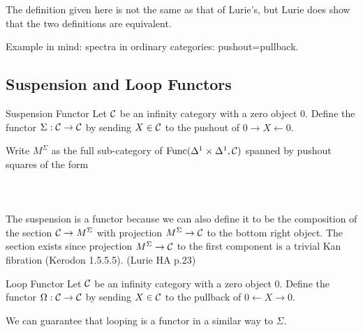 \documentclass[a4paper]{article}
\begin{document}
The definition given here is not the same as that of Lurie's, but Lurie does show that the two definitions are equivalent. 

Example in mind: spectra in ordinary categories: pushout=pullback. 

\subsection{Suspension and Loop Functors}
\begin{defn}{Suspension Functor}{} Let $\mathcal{C}$ be an infinity category with a zero object $0$. Define the functor $\Sigma:\mathcal{C}\to\mathcal{C}$ by sending $X\in\mathcal{C}$ to the pushout of $0\rightarrow X\leftarrow 0$. 
\end{defn}

Write $M^\Sigma$ as the full sub-category of $\text{Func}(\Delta^1\times\Delta^1,\mathcal{C})$ spanned by pushout squares of the form \\~\\
\\~\\
The suspension is a functor because we can also define it to be the composition of the section $\mathcal{C}\to M^\Sigma$ with projection $M^\Sigma\to\mathcal{C}$ to the bottom right object. The section exists since projection $M^\Sigma\to\mathcal{C}$ to the first component is a trivial Kan fibration (Kerodon 1.5.5.5). (Lurie HA p.23)

\begin{defn}{Loop Functor}{} Let $\mathcal{C}$ be an infinity category with a zero object $0$. Define the functor $\Omega:\mathcal{C}\to\mathcal{C}$ by sending $X\in\mathcal{C}$ to the pullback of $0\leftarrow X\rightarrow0$. 
\end{defn}

We can guarantee that looping is a functor in a similar way to $\Sigma$. 
\end{document}
